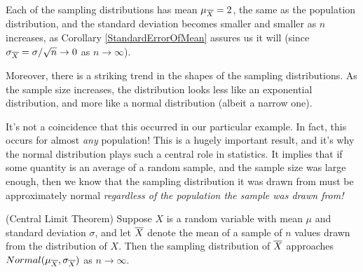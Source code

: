 \begin{center}
    \begin{minipage}{.5\textwidth}
        \centering
    \end{minipage}%
    \begin{minipage}{0.5\textwidth}
        \centering
\end{minipage}
\end{center}
\par
Each of the sampling distributions has mean $\mu_{\overline{X}} = 2$, the same as the population distribution, and the standard deviation becomes smaller and smaller as $n$ increases, as Corollary \ref{StandardErrorOfMean} assures us it will (since $\sigma_{\overline{X}} = \sigma / \sqrt{n} \to 0$ as $n \to \infty$).
\par
Moreover, there is a striking trend in the shapes of the sampling distributions. As the sample size increases, the distribution looks less like an exponential distribution, and more like a normal distribution (albeit a narrow one).
\par
It's not a coincidence that this occurred in our particular example. In fact, this occurs for almost \emph{any} population! This is a hugely important result, and it's why the normal distribution plays such a central role in statistics. It implies that if some quantity is an average of a random sample, and the sample size was large enough, then we know that the sampling distribution it was drawn from must be approximately normal \emph{regardless of the population the sample was drawn from!}
\par
\begin{thm} (Central Limit Theorem)\label{CLT} Suppose $X$ is a random variable with mean $\mu$ and standard deviation $\sigma$, and let ${\overline{X}}$ denote the mean of a sample of $n$ values drawn from the distribution of $X$. Then the sampling distribution of ${\overline{X}}$ approaches $Normal(\mu_{\overline{X}},\sigma_{\overline{X}})$ as $n \to \infty$.
\end{thm}

